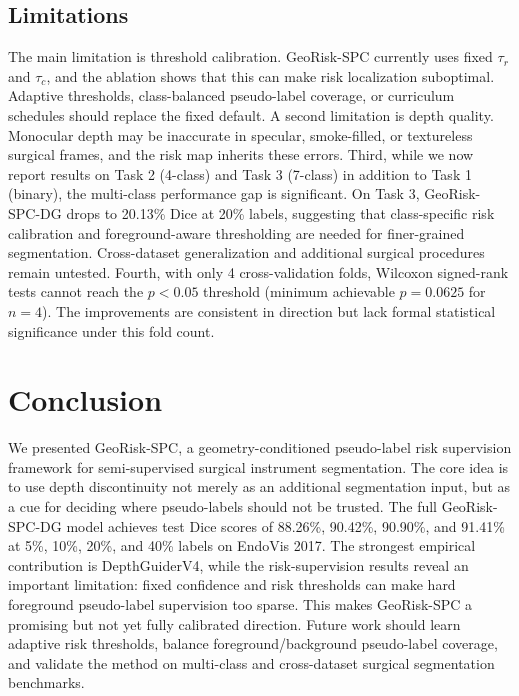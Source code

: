 \documentclass[journal]{IEEEtran}
\begin{document}
\subsection{Limitations}
The main limitation is threshold calibration. GeoRisk-SPC currently uses fixed $\tau_r$ and $\tau_c$, and the ablation shows that this can make risk localization suboptimal. Adaptive thresholds, class-balanced pseudo-label coverage, or curriculum schedules should replace the fixed default. A second limitation is depth quality. Monocular depth may be inaccurate in specular, smoke-filled, or textureless surgical frames, and the risk map inherits these errors. Third, while we now report results on Task 2 (4-class) and Task 3 (7-class) in addition to Task 1 (binary), the multi-class performance gap is significant. On Task 3, GeoRisk-SPC-DG drops to 20.13\% Dice at 20\% labels, suggesting that class-specific risk calibration and foreground-aware thresholding are needed for finer-grained segmentation. Cross-dataset generalization and additional surgical procedures remain untested. Fourth, with only 4 cross-validation folds, Wilcoxon signed-rank tests cannot reach the $p<0.05$ threshold (minimum achievable $p=0.0625$ for $n=4$). The improvements are consistent in direction but lack formal statistical significance under this fold count.

\section{Conclusion}
We presented GeoRisk-SPC, a geometry-conditioned pseudo-label risk supervision framework for semi-supervised surgical instrument segmentation. The core idea is to use depth discontinuity not merely as an additional segmentation input, but as a cue for deciding where pseudo-labels should not be trusted. The full GeoRisk-SPC-DG model achieves test Dice scores of 88.26\%, 90.42\%, 90.90\%, and 91.41\% at 5\%, 10\%, 20\%, and 40\% labels on EndoVis 2017. The strongest empirical contribution is DepthGuiderV4, while the risk-supervision results reveal an important limitation: fixed confidence and risk thresholds can make hard foreground pseudo-label supervision too sparse. This makes GeoRisk-SPC a promising but not yet fully calibrated direction. Future work should learn adaptive risk thresholds, balance foreground/background pseudo-label coverage, and validate the method on multi-class and cross-dataset surgical segmentation benchmarks.



\end{document}
